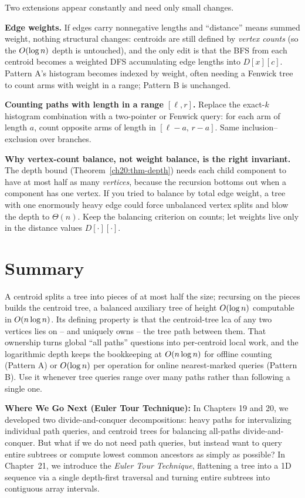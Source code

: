 Two extensions appear constantly and need only small changes.

\textbf{Edge weights.} If edges carry nonnegative lengths and ``distance'' means
summed weight, nothing structural changes: centroids are still defined by
\emph{vertex counts} (so the $O(\log n)$ depth is untouched), and the only edit
is that the BFS from each centroid becomes a weighted DFS accumulating edge lengths
into $D[x][c]$. Pattern A's histogram becomes indexed by weight, often needing a
Fenwick tree to count arms with weight in a range; Pattern B is unchanged.

\textbf{Counting paths with length in a range $[\ell,r]$.} Replace the exact-$k$
histogram combination with a two-pointer or Fenwick query: for each arm of length $a$, count
opposite arms of length in $[\ell-a,\,r-a]$. Same inclusion--exclusion over
branches.

\begin{formalbox}
\textbf{Why vertex-count balance, not weight balance, is the right invariant.} The
depth bound (Theorem~\ref{ch20:thm-depth}) needs each child component to have at
most half as many \emph{vertices}, because the recursion bottoms out when a
component has one vertex. If you tried to balance by total edge weight, a tree with
one enormously heavy edge could force unbalanced vertex splits and blow the depth
to $\Theta(n)$. Keep the balancing criterion on counts; let weights live only in
the distance values $D[\cdot][\cdot]$.
\end{formalbox}

\section*{Summary}

A centroid splits a tree into pieces of at most half the size; recursing on the
pieces builds the centroid tree, a balanced auxiliary tree of height
$O(\log n)$ computable in $O(n\log n)$. Its defining property is that the
centroid-tree lca of any two vertices lies on -- and uniquely owns -- the tree path
between them. That ownership turns global ``all paths'' questions into per-centroid
local work, and the logarithmic depth keeps the bookkeeping at $O(n\log n)$ for
offline counting (Pattern A) or $O(\log n)$ per operation for online
nearest-marked queries (Pattern B). Use it whenever tree queries range over
many paths rather than following a single one.

\textbf{Where We Go Next (Euler Tour Technique):} In Chapters 19 and 20, we developed two divide-and-conquer decompositions: heavy paths for intervalizing individual path queries, and centroid trees for balancing all-paths divide-and-conquer. But what if we do not need path queries, but instead want to query entire subtrees or compute lowest common ancestors as simply as possible? In Chapter~21, we introduce the \emph{Euler Tour Technique}, flattening a tree into a 1D sequence via a single depth-first traversal and turning entire subtrees into contiguous array intervals.


